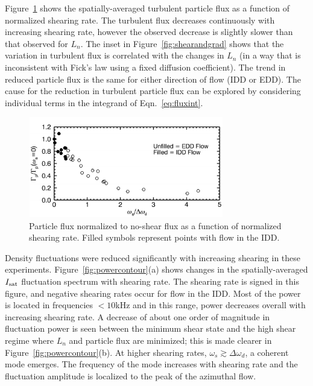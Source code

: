\documentclass[aps,prl,amsmath,amssymb,preprint,superscriptaddress]{revtex4}
\begin{document}
Figure~\ref{fig:fluxvsshear} shows the spatially-averaged turbulent
particle flux as a function of normalized shearing rate.  The
turbulent flux decreases continuously with increasing shearing rate,
however the observed decrease is slightly slower than that observed
for $L_n$.  The inset in Figure~\ref{fig:shearandgrad} shows that the variation in
turbulent flux is correlated with the changes in $L_n$ (in a way
that is inconsistent with Fick's law using a fixed diffusion coefficient).  The
trend in reduced particle flux is the same for either direction of
flow (IDD or EDD).  The cause for the reduction in turbulent particle
flux can be explored by considering individual terms in the integrand
of Eqn.~\ref{eq:fluxint}.


\begin{figure}[!htbp]
\centerline{
\includegraphics[width=8.5cm]{fluxvsshear}}
\caption{\label{fig:fluxvsshear} Particle flux normalized to no-shear
  flux as a function of normalized shearing rate. Filled symbols
  represent points with flow in the IDD.}
\end{figure}


Density fluctuations were reduced significantly with increasing
shearing in these experiments.  Figure~\ref{fig:powercontour}(a) shows
changes in the spatially-averaged $I_{\rm sat}$ fluctuation spectrum
with shearing rate.  The shearing rate is signed in this figure, and
negative shearing rates occur for flow in the IDD. Most of the power
is located in frequencies $<10$kHz and in this range, power decreases
overall with increasing shearing rate.  A decrease of about one order
of magnitude in fluctuation power is seen between the minimum shear
state and the high shear regime where $L_n$ and particle flux are
minimized; this is made clearer in Figure~\ref{fig:powercontour}(b).  At
higher shearing rates, $\omega_s \gtrsim \Delta \omega_d$, a coherent
mode emerges.  The frequency of the mode increases with shearing rate
and the fluctuation amplitude is localized to the peak of the
azimuthal flow.
\end{document}
